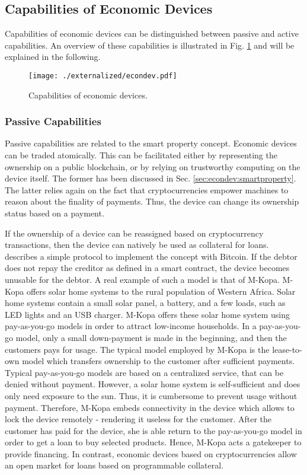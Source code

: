 \subsection{Capabilities of Economic Devices}

Capabilities of economic devices can be distinguished between passive and active capabilities. An overview of these capabilities is illustrated in Fig. \ref{fig:econdev} and will be explained in the following.

\begin{figure}
\centering
\texttt{[image: ./externalized/econdev.pdf]}
\caption{Capabilities of economic devices.}
\label{fig:econdev}
\end{figure}

\subsubsection{Passive Capabilities}

Passive capabilities are related to the smart property concept.
Economic devices can be traded atomically. This can be facilitated either by representing the ownership on a public blockchain, or by relying on trustworthy computing on the device itself. The former has been discussed in Sec. \ref{sec:econdev:smartproperty}. The latter relies again on the fact that cryptocurrencies empower machines to reason about the finality of payments. Thus, the device can change its ownership status based on a payment. 

If the ownership of a device can be reassigned based on cryptocurrency transactions, then the device can natively be used as collateral for loans. \cite{smartproperty2011} describes a simple protocol to implement the concept with Bitcoin. If the debtor does not repay the creditor as defined in a smart contract, the device becomes unusable for the debtor. A real example of such a model is that of M-Kopa. M-Kopa offers solar home systems to the rural population of Western Africa. Solar home systems contain a small solar panel, a battery, and a few loads, such as LED lights and an USB charger. M-Kopa offers these solar home system using pay-as-you-go models in order to attract low-income households. In a pay-as-you-go model, only a small down-payment is made in the beginning, and then the customers pays for usage. The typical model employed by M-Kopa is the lease-to-own model which transfers ownership to the customer after sufficient payments. Typical pay-as-you-go models are based on a centralized service, that can be denied without payment. However, a solar home system is self-sufficient and does only need exposure to the sun. Thus, it is cumbersome to prevent usage without payment. Therefore, M-Kopa embeds connectivity in the device which allows to lock the device remotely - rendering it useless for the customer. After the customer has paid for the device, she is able return to the pay-as-you-go model in order to get a loan to buy selected products. Hence, M-Kopa acts a gatekeeper to provide financing. In contrast, economic devices based on cryptocurrencies allow an open market for loans based on programmable collateral.

